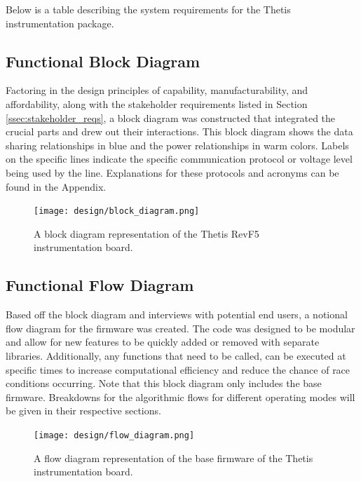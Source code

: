 Below is a table describing the system requirements for the Thetis instrumentation package.



\subsection{Functional Block Diagram} \label{ssec:block_diagram}
Factoring in the design principles of capability, manufacturability, and affordability, along with the stakeholder requirements listed in Section \ref{ssec:stakeholder_reqs}, a block diagram was constructed that integrated the crucial parts and drew out their interactions.
This block diagram shows the data sharing relationships in blue and the power relationships in warm colors.
Labels on the specific lines indicate the specific communication protocol or voltage level being used by the line.
Explanations for these protocols and acronyms can be found in the Appendix.

\begin{figure}[h!]
	\label{fig:thetis_block_diagram}
	\caption[Thetis RevF5 Block Diagram]{A block diagram representation of the Thetis RevF5 instrumentation board.}
	\centering
	\texttt{[image: design/block\_diagram.png]}
\end{figure}

\subsection{Functional Flow Diagram} \label{ssec:flow_diagram}
Based off the block diagram and interviews with potential end users, a notional flow diagram for the firmware was created.
The code was designed to be modular and allow for new features to be quickly added or removed with separate libraries.
Additionally, any functions that need to be called, can be executed at specific times to increase computational efficiency and reduce the chance of race conditions occurring.
Note that this block diagram only includes the base firmware.
Breakdowns for the algorithmic flows for different operating modes will be given in their respective sections.

\begin{figure}[h!]
	\label{fig:thetis_flow_diagram}
	\caption[Base Firmware Flow Diagram]{A flow diagram representation of the base firmware of the Thetis instrumentation board.}
	\centering
	\texttt{[image: design/flow\_diagram.png]}
\end{figure}

